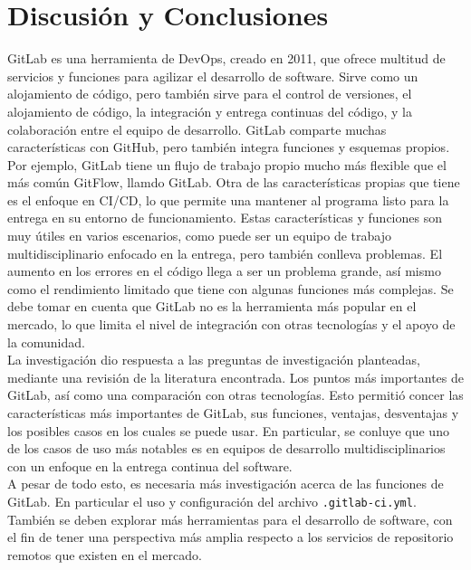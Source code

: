 \documentclass[runningheads]{llncs}
\begin{document}
\section{Discusión y Conclusiones}
GitLab es una herramienta de DevOps, creado en 2011, que ofrece multitud de servicios y funciones para agilizar el desarrollo de software. Sirve como un alojamiento de código,
pero también sirve para el control de versiones, el alojamiento de código, la integración y entrega continuas del código, y la colaboración entre el equipo de
desarrollo. GitLab comparte muchas características con GitHub, pero también integra funciones y esquemas propios. Por ejemplo, GitLab tiene un flujo de trabajo
propio mucho más flexible que el más común GitFlow, llamdo GitLab. Otra de las características propias que tiene es el enfoque en CI/CD, lo que permite una
mantener al programa listo para la entrega en su entorno de funcionamiento. Estas características y funciones son muy útiles en varios escenarios, como puede ser un
equipo de trabajo multidisciplinario enfocado en la entrega, pero también conlleva problemas. El aumento en los errores en el código llega a ser un problema grande,
así mismo como el rendimiento limitado que tiene con algunas funciones más complejas. Se debe tomar en cuenta que GitLab no es la herramienta más popular en el mercado,
lo que limita el nivel de integración con otras tecnologías y el apoyo de la comunidad.\\
La investigación dio respuesta a las preguntas de investigación planteadas, mediante una revisión de la literatura encontrada. Los puntos más importantes de GitLab, así como
una comparación con otras tecnologías. Esto permitió concer las características más importantes de GitLab, sus funciones, ventajas, desventajas y los posibles casos en los
cuales se puede usar. En particular, se conluye que uno de los casos de uso más notables es en equipos de desarrollo multidisciplinarios con un enfoque en la entrega continua
del software.\\
A pesar de todo esto, es necesaria más investigación acerca de las funciones de GitLab. En particular el uso y configuración del archivo \texttt{.gitlab-ci.yml}. También se
deben explorar más herramientas para el desarrollo de software, con el fin de tener una perspectiva más amplia respecto a los servicios de repositorio remotos que existen en
el mercado.


\end{document}
